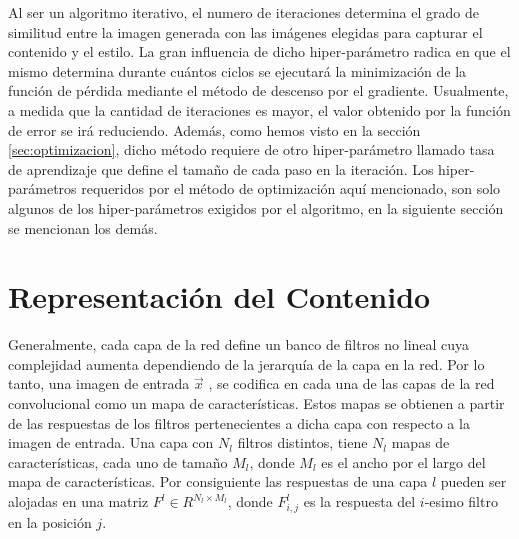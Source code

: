 \documentclass[a4paper,11pt,spanish]{book}
\begin{document}
      Al ser un algoritmo iterativo, el numero de iteraciones determina el grado de similitud entre la imagen generada con las imágenes elegidas para capturar el contenido y el estilo. 
      La gran influencia de dicho hiper-parámetro radica en que el mismo determina durante cuántos ciclos se  ejecutará la minimización de la función de pérdida mediante el método de descenso por el gradiente.
      Usualmente, a medida que la cantidad de iteraciones es mayor, el valor obtenido por la función de error se irá reduciendo.
      Además, como hemos visto en la sección \ref{sec:optimizacion}, dicho método requiere de otro hiper-parámetro llamado tasa de aprendizaje que define el tamaño de cada 
      paso en la iteración.
      Los hiper-parámetros requeridos por el método de optimización aquí mencionado, son solo algunos de los hiper-parámetros exigidos por el algoritmo, en la siguiente sección se mencionan los demás.
      
    \section{Representación del Contenido} \label{sec:contenido}
      Generalmente, cada capa de la red define un banco de filtros no lineal cuya complejidad aumenta dependiendo de la jerarquía de la capa en la red.
      Por lo tanto, una imagen de entrada $\overrightarrow{x}$ , se codifica en cada una de las capas de la red convolucional como un mapa de características.
      Estos mapas se obtienen a partir de las respuestas de los filtros pertenecientes a dicha capa con respecto a la imagen de entrada.
      Una capa con $N_l$ filtros distintos, tiene $N_l$ mapas de características, cada uno de tamaño $M_l$, donde $M_l$ es el ancho por el largo del mapa de características.
      Por consiguiente las respuestas de una capa $l$ pueden ser alojadas en una matriz $F^l \in R^{N_l \times M_l}$, donde $F_{i,j}^l$ es la respuesta del $i$-esimo filtro en la posición $j$.
      
\end{document}
